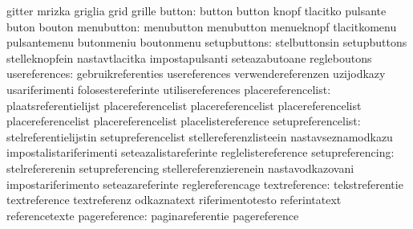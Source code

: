                                   gitter                           mrizka
                                  griglia                          grid
                                  grille
                          button: button                           button
                                  knopf                            tlacitko
                                  pulsante                         buton
                                  bouton
                      menubutton: menubutton                       menubutton
                                  menueknopf                       tlacitkomenu
                                  pulsantemenu                     butonmeniu
                                  boutonmenu
                    setupbuttons: stelbuttonsin                    setupbuttons
                                  stelleknopfein                   nastavtlacitka
                                  impostapulsanti                  seteazabutoane
                                  regleboutons
                   usereferences: gebruikreferenties               usereferences
                                  verwendereferenzen               uzijodkazy
                                  usariferimenti                   folosestereferinte
                                  utilisereferences
              placereferencelist: plaatsreferentielijst            placereferencelist
                                  placereferencelist               placereferencelist
                                  placereferencelist               placereferencelist
                                  placelistereference
              setupreferencelist: stelreferentielijstin            setupreferencelist
                                  stellereferenzlisteein           nastavseznamodkazu
                                  impostalistariferimenti          seteazalistareferinte
                                  reglelistereference
                setupreferencing: stelrefererenin                  setupreferencing
                                  stellereferenzierenein           nastavodkazovani
                                  impostariferimento               seteazareferinte
                                  reglereferencage
                   textreference: tekstreferentie                  textreference
                                  textreferenz                     odkaznatext
                                  riferimentotesto                 referintatext
                                  referencetexte
                   pagereference: paginareferentie                 pagereference
